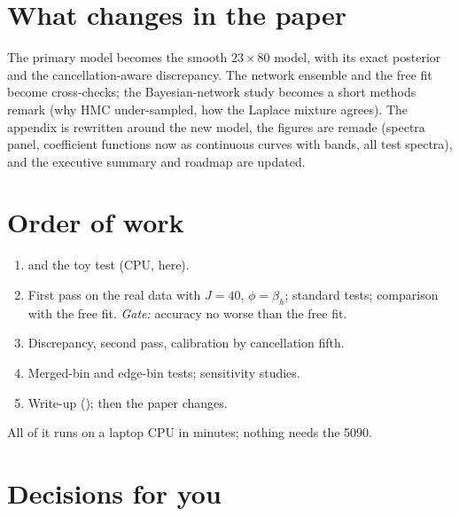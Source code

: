 \section{What changes in the paper}

The primary model becomes the smooth $23\times80$ model, with its exact posterior and the
cancellation-aware discrepancy. The network ensemble and the free fit become cross-checks;
the Bayesian-network study becomes a short methods remark (why HMC under-sampled, how the
Laplace mixture agrees). The appendix is rewritten around the new model, the figures are
remade (spectra panel, coefficient functions now as continuous curves with bands, all test
spectra), and the executive summary and roadmap are updated.

\section{Order of work}

\begin{enumerate}
  \item {} and the toy test (CPU, here).
  \item First pass on the real data with $J = 40$, $\phi = \beta_h$; standard tests;
    comparison with the free fit. \emph{Gate:} accuracy no worse than the free fit.
  \item Discrepancy, second pass, calibration by cancellation fifth.
  \item Merged-bin and edge-bin tests; sensitivity studies.
  \item Write-up (); then the paper changes.
\end{enumerate}
All of it runs on a laptop CPU in minutes; nothing needs the 5090.

\section{Decisions for you}
\label{sec:decisions}

